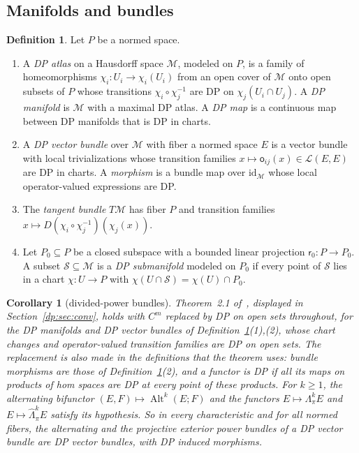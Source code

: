 \documentclass[11pt]{amsart}
\newtheorem{corollary}[theorem]{Corollary}
\theoremstyle{definition}
\newtheorem{definition}[theorem]{Definition}
\theoremstyle{remark}
\numberwithin{equation}{section}
\newcommand{\cL}{\mathcal L}
\newcommand{\Alt}{\operatorname{Alt}}
\newcommand{\id}{\mathrm{id}}
\theoremstyle{plain}
\theoremstyle{definition}
\theoremstyle{plain}
\newcommand{\cS}{\mathcal S}
\begin{document}
\subsection{Manifolds and bundles}\label{dp:ssec:bundles}

\begin{definition}\label{dp:def:manifold}
Let $P$ be a normed space.
\begin{enumerate}
\item A \emph{DP atlas} on a Hausdorff space $\mathcal M$, modeled on $P$, is a family of homeomorphisms $\chi_i\colon U_i\to\chi_i(U_i)$ from an open cover of $\mathcal M$ onto open subsets of $P$ whose transitions $\chi_i\circ\chi_j^{-1}$ are DP on $\chi_j(U_i\cap U_j)$. A \emph{DP manifold} is $\mathcal M$ with a maximal DP atlas. A \emph{DP map} is a continuous map between DP manifolds that is DP in charts.
\item A \emph{DP vector bundle} over $\mathcal M$ with fiber a normed space $E$ is a vector bundle with local trivializations whose transition families $x\mapsto\mathsf o_{ij}(x)\in\cL(E,E)$ are DP in charts. A \emph{morphism} is a bundle map over $\id_{\mathcal M}$ whose local operator-valued expressions are DP.
\item The \emph{tangent bundle} $T\mathcal M$ has fiber $P$ and transition families $x\mapsto D(\chi_i\circ\chi_j^{-1})(\chi_j(x))$.
\item Let $P_0\subseteq P$ be a closed subspace with a bounded linear projection $\mathsf r_0\colon P\to P_0$. A subset $\cS\subseteq\mathcal M$ is a \emph{DP submanifold} modeled on $P_0$ if every point of $\cS$ lies in a chart $\chi\colon U\to P$ with $\chi(U\cap\cS)=\chi(U)\cap P_0$.
\end{enumerate}
\end{definition}

\begin{corollary}[divided-power bundles]\label{dp:cor:bundles}
Theorem~2.1 of~\cite{I}, displayed in Section~\ref{dp:sec:conv}, holds with $C^m$ replaced by DP on open sets throughout, for the DP manifolds and DP vector bundles of Definition~\ref{dp:def:manifold}(1),(2), whose chart changes and operator-valued transition families are DP on open sets. The replacement is also made in the definitions that the theorem uses: bundle morphisms are those of Definition~\ref{dp:def:manifold}(2), and a functor is DP if all its maps on products of hom spaces are DP at every point of these products. For $k\ge1$, the alternating bifunctor $(E,F)\mapsto\Alt^k(E;F)$ and the functors $E\mapsto\Lambda^k_\pi E$ and $E\mapsto\widehat\Lambda^k_\pi E$ satisfy its hypothesis. So in every characteristic and for all normed fibers, the alternating and the projective exterior power bundles of a DP vector bundle are DP vector bundles, with DP induced morphisms.
\end{corollary}
\end{document}
